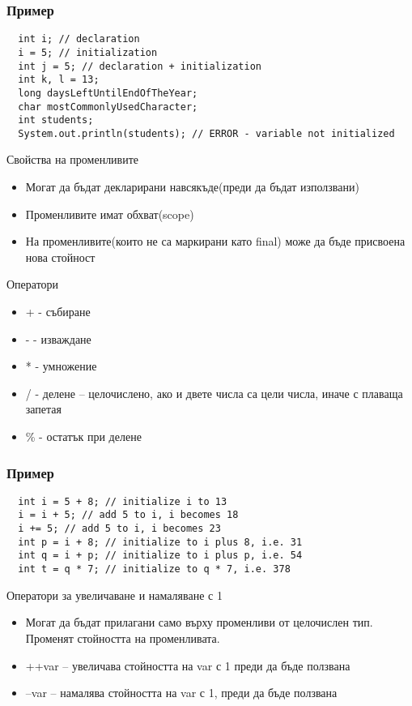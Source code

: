 \documentclass{beamer}
\begin{document}
\begin{frame}[fragile]
  \frametitle{Пример}
\begin{lstlisting}
  int i; // declaration
  i = 5; // initialization
  int j = 5; // declaration + initialization
  int k, l = 13;
  long daysLeftUntilEndOfTheYear;
  char mostCommonlyUsedCharacter;
  int students;
  System.out.println(students); // ERROR - variable not initialized
\end{lstlisting}
\end{frame}

\begin{frame}{Свойства на променливите}
  \begin{itemize}
  \item Могат да бъдат декларирани навсякъде(преди да бъдат
    използвани)
  \item Променливите имат обхват(scope)
  \item На променливите(които не са маркирани като final) може да бъде
    присвоена нова стойност
  \end{itemize}
\end{frame}

\begin{frame}{Оператори}
  \begin{itemize}
  \item + - събиране
  \item - - изваждане
  \item * - умножение
  \item / - делене – целочислено, ако и двете
    числа са цели числа, иначе с плаваща
    запетая
  \item \% - остатък при делене
  \end{itemize}
\end{frame}

\begin{frame}[fragile]
  \frametitle{Пример}
\begin{lstlisting}
  int i = 5 + 8; // initialize i to 13
  i = i + 5; // add 5 to i, i becomes 18
  i += 5; // add 5 to i, i becomes 23
  int p = i + 8; // initialize to i plus 8, i.e. 31
  int q = i + p; // initialize to i plus p, i.e. 54
  int t = q * 7; // initialize to q * 7, i.e. 378
\end{lstlisting}
\end{frame}


\begin{frame}{Оператори за увеличаване и намаляване с 1}
  \begin{itemize}
  \item   Могат да бъдат прилагани само върху
    променливи от целочислен тип.
    Променят стойността на променливата.

   \item ++var – увеличава стойността на var с 1
    преди да бъде ползвана

   \item --var – намалява стойността на var с 1,
    преди да бъде ползвана

  \end{itemize}
\end{frame}
\end{document}
